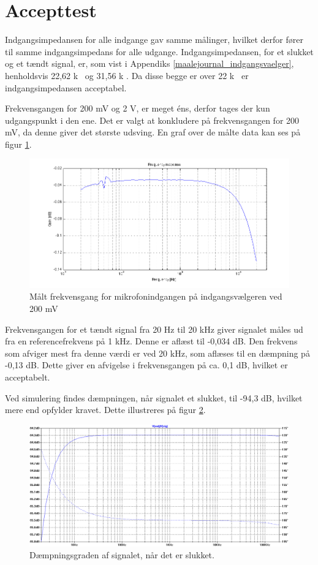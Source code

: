 \section{Accepttest}
Indgangsimpedansen for alle indgange gav samme målinger, hvilket derfor fører til samme indgangsimpedans for alle udgange. Indgangsimpedansen, for et slukket og et tændt signal, er, som vist i Appendiks \ref{maalejournal_indgangsvaelger}, henholdsvis 22,62 k\ohm~ og 31,56 k \ohm . Da disse begge er over 22 k\ohm~ er indgangsimpedansen acceptabel.

Frekvensgangen for 200 mV og 2 V, er meget éns, derfor tages der kun udgangspunkt i den ene. Det er valgt at konkludere på frekvensgangen for 200 mV, da denne giver det største udsving. En graf over de målte data kan ses på figur \ref{fig:indacc:frek200mv}.
\begin{figure}[h]
\centering
\includegraphics[width=\textwidth]{maalerapporter/indgangsvaelger/Indgangsvlger-mic-200mv-frek.png}
\caption{Målt frekvensgang for mikrofonindgangen på indgangsvælgeren ved 200 mV}
\label{fig:indacc:frek200mv}
\end{figure}

Frekvensgangen for et tændt signal fra 20 Hz til 20 kHz giver signalet måles ud fra en referencefrekvens på 1 kHz. Denne er aflæst til -0,034 dB. Den frekvens som afviger mest fra denne værdi er ved 20 kHz, som aflæses til en dæmpning på -0,13 dB. Dette giver en afvigelse i frekvensgangen på ca. 0,1 dB, hvilket er acceptabelt.

Ved simulering findes dæmpningen, når signalet et slukket, til -94,3 dB, hvilket mere end opfylder kravet. Dette illustreres på figur \ref{fig:indaccept:slukketsimulering}.
\begin{figure}[h]
\centering
\includegraphics[width=\textwidth]{teknisk/indgangsvaelger/simulering/daempning_af_signal.png}
\caption{Dæmpningsgraden af signalet, når det er slukket.}
\label{fig:indaccept:slukketsimulering}
\end{figure}

